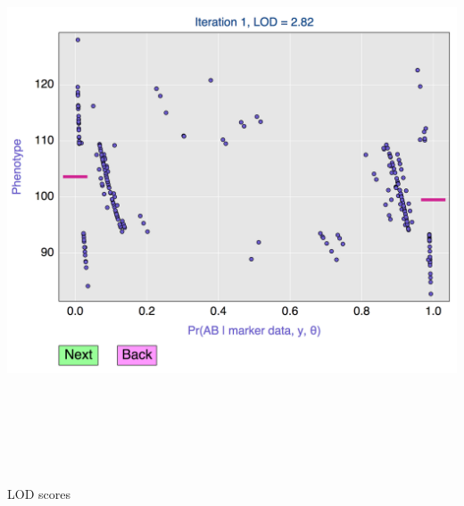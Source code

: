 \documentclass[12pt]{article}
\newcommand{\headsize}{\fontsize{35}{35} \selectfont}
\begin{document}
\centerline{\href{http://www.biostat.wisc.edu/~kbroman/D3/em_alg/}{\includegraphics[height=6.5in]{FigsA/em_alg_illustration.png}}}

\vspace*{1cm}


\newpage

\headsize \color{myyellow}
\hfill \begin{minipage}{5.75in}
\centering
LOD scores
\end{minipage}

\vspace{25mm}
\end{document}
